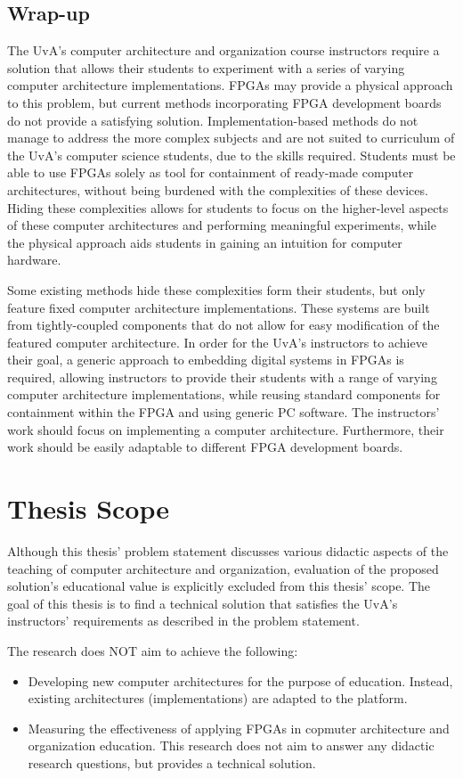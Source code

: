 \documentclass[singleside,openright]{uva-bachelor-thesis}
\begin{document}
\subsection{Wrap-up}
The UvA's computer architecture and organization course instructors require a solution that allows their students to experiment with a series of varying computer architecture implementations. FPGAs may provide a physical approach to this problem, but current methods incorporating FPGA development boards do not provide a satisfying solution. Implementation-based methods do not manage to address the more complex subjects and are not suited to curriculum of the UvA's computer science students, due to the skills required. Students must be able to use FPGAs solely as tool for containment of ready-made computer architectures, without being burdened with the complexities of these devices. Hiding these complexities allows for students to focus on the higher-level aspects of these computer architectures and performing meaningful experiments, while the physical approach aids students in gaining an intuition for computer hardware.

Some existing methods hide these complexities form their students, but only feature fixed computer architecture implementations. These systems are built from tightly-coupled components that do not allow for easy modification of the featured computer architecture. In order for the UvA's instructors to achieve their goal, a generic approach to embedding digital systems in FPGAs is required, allowing instructors to provide their students with a range of varying computer architecture implementations, while reusing standard components for containment within the FPGA and using generic PC software. The instructors' work should focus on implementing a computer architecture. Furthermore, their work should be easily adaptable to different FPGA development boards.

\section{Thesis Scope}
Although this thesis' problem statement discusses various didactic aspects of the teaching of computer architecture and organization, evaluation of the proposed solution's educational value is explicitly excluded from this thesis' scope. The goal of this thesis is to find a technical solution that satisfies the UvA's instructors' requirements as described in the problem statement. 


The research does NOT aim to achieve the following:
\begin{itemize}
\item Developing new computer architectures for the purpose of education. Instead, existing architectures (implementations) are adapted to the platform.
\item Measuring the effectiveness of applying FPGAs in copmuter architecture and organization education. This research does not aim to answer any didactic research questions, but provides a technical solution.
\end{itemize}
\end{document}

